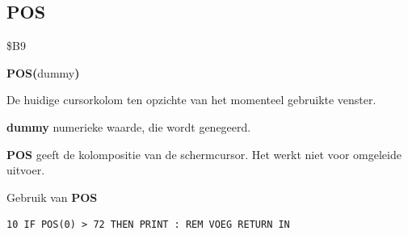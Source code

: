 
\newpage
\subsection{POS}
\begin{description}[leftmargin=2cm,style=nextline]
\item [Token:]    \$B9

\item [Formaat:]   {\bf POS(}dummy{\bf)}

\item [Retourneert:]  De huidige cursorkolom ten opzichte van het momenteel gebruikte venster.

                  {\bf dummy} numerieke waarde, die wordt genegeerd.

\item [Opmerkingen:]  {\bf POS} geeft de kolompositie van de schermcursor. Het werkt niet voor omgeleide uitvoer.

\item [Voorbeeld:]  Gebruik van {\bf POS}

\begin{tcolorbox}[colback=black,coltext=white]
\verbatimfont{\codefont}
\begin{verbatim}
10 IF POS(0) > 72 THEN PRINT : REM VOEG RETURN IN
\end{verbatim}
\end{tcolorbox}
\end{description}


\newpage
